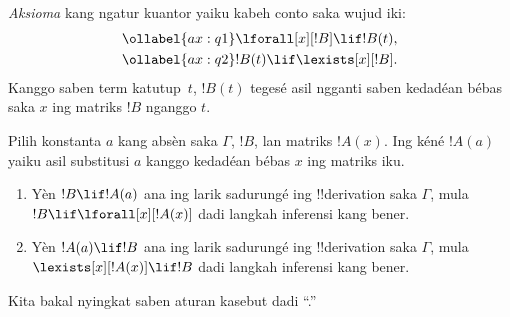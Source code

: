 \documentclass[../../../include/open-logic-section]{subfiles}
\begin{document}


\begin{defn}
\emph{Aksioma} kang ngatur kuantor yaiku kabeh conto saka wujud iki:
\begin{align}
\ollabel{ax:q1} & \lforall[x][!B] \lif !B(t), \\
\ollabel{ax:q2} & !B(t) \lif \lexists[x][!B].
\end{align}
Kanggo saben term katutup~$t$, $!B(t)$ tegesé asil ngganti saben kedadéan bébas saka $x$
ing matriks $!B$ nganggo $t$.
\end{defn}

\begin{defn}
Pilih konstanta $a$ kang absèn saka $\Gamma$, $!B$, lan matriks $!A(x)$.
Ing kéné $!A(a)$ yaiku asil substitusi $a$ kanggo kedadéan bébas $x$
ing matriks iku.
\begin{enumerate}
\item Yèn $!B \lif !A(a)$ ana ing larik sadurungé ing !!{derivation}
  saka $\Gamma$, mula $!B \lif \lforall[x][!A(x)]$ dadi langkah
  inferensi kang bener.
\item Yèn $!A(a) \lif !B$ ana ing larik sadurungé ing !!{derivation}
  saka $\Gamma$, mula $\lexists[x][!A(x)] \lif !B$ dadi langkah
  inferensi kang bener.
\end{enumerate}
\end{defn}

Kita bakal nyingkat saben aturan kasebut dadi ``\QR.''
\end{document}
